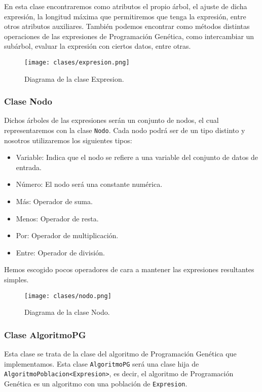 En esta clase encontraremos como atributos el propio árbol, el ajuste de dicha expresión, la longitud máxima que permitiremos que tenga la expresión, entre otros atributos auxiliares. También podemos encontrar como métodos distintas operaciones de las expresiones de Programación Genética, como intercambiar un subárbol, evaluar la expresión con ciertos datos, entre otras.


\begin{figure}[H]
	 \centering
	 \texttt{[image: clases/expresion.png]}
	 \caption{Diagrama de la clase Expresion.}
	\label{fig:diagrama_clase_expresion}
\end{figure}

\subsubsection{Clase Nodo}

Dichos árboles de las expresiones serán un conjunto de nodos, el cual representaremos con la clase \texttt{Nodo}. Cada nodo podrá ser de un tipo distinto y nosotros utilizaremos los siguientes tipos:

\begin{itemize}
	\item Variable: Indica que el nodo se refiere a una variable del conjunto de datos de entrada.
	\item Número: El nodo será una constante numérica.
	\item Más: Operador de suma.
	\item Menos: Operador de resta.
	\item Por: Operador de multiplicación.
	\item Entre: Operador de división.
\end{itemize}

Hemos escogido pocos operadores de cara a mantener las expresiones resultantes simples.

\begin{figure}[H]
	 \centering
	 \texttt{[image: clases/nodo.png]}
	 \caption{Diagrama de la clase Nodo.}
	\label{fig:diagrama_clase_nodo}
\end{figure}

\newpage

\subsubsection{Clase AlgoritmoPG}

Esta clase se trata de la clase del algoritmo de Programación Genética que implementamos. Esta clase \texttt{AlgoritmoPG} será una clase hija de \texttt{AlgoritmoPoblacion<Expresion>}, es decir, el algoritmo de Programación Genética es un algoritmo con una población de \texttt{Expresion}.

